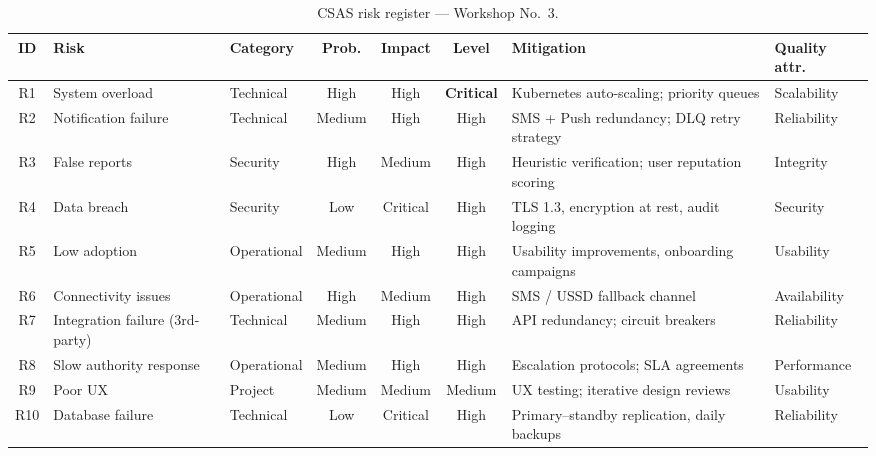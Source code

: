 \documentclass[conference,a4paper,10pt]{IEEEtran}
\begin{document}
\begin{table}[!t]
\centering
\caption{CSAS risk register --- Workshop No.\ 3.}
\label{tab:risks}
\renewcommand{\arraystretch}{1.25}
\footnotesize
\begin{tabularx}{\textwidth}{c l l c c c X l}
\toprule
\rowcolor{tableheader}
\textbf{ID} & \textbf{Risk} & \textbf{Category} & \textbf{Prob.} & \textbf{Impact}
& \textbf{Level} & \textbf{Mitigation} & \textbf{Quality attr.} \\
\midrule
R1  & System overload                   & Technical   & High   & High     & \cellcolor{critrisk}\textbf{Critical} & Kubernetes auto-scaling; priority queues          & Scalability   \\
R2  & Notification failure              & Technical   & Medium & High     & \cellcolor{highrisk}High     & SMS + Push redundancy; DLQ retry strategy            & Reliability   \\
R3  & False reports                     & Security    & High   & Medium   & \cellcolor{highrisk}High     & Heuristic verification; user reputation scoring      & Integrity     \\
R4  & Data breach                       & Security    & Low    & Critical & \cellcolor{highrisk}High     & TLS 1.3, encryption at rest, audit logging           & Security      \\
R5  & Low adoption                      & Operational & Medium & High     & \cellcolor{highrisk}High     & Usability improvements, onboarding campaigns         & Usability     \\
R6  & Connectivity issues               & Operational & High   & Medium   & \cellcolor{highrisk}High     & SMS / USSD fallback channel                          & Availability  \\
R7  & Integration failure (3rd-party)   & Technical   & Medium & High     & \cellcolor{highrisk}High     & API redundancy; circuit breakers                     & Reliability   \\
R8  & Slow authority response           & Operational & Medium & High     & \cellcolor{highrisk}High     & Escalation protocols; SLA agreements                 & Performance   \\
R9  & Poor UX                           & Project     & Medium & Medium   & \cellcolor{medrisk}Medium    & UX testing; iterative design reviews                 & Usability     \\
R10 & Database failure                  & Technical   & Low    & Critical & \cellcolor{highrisk}High     & Primary--standby replication, daily backups          & Reliability   \\
\bottomrule
\end{tabularx}
\end{table}
\end{document}
